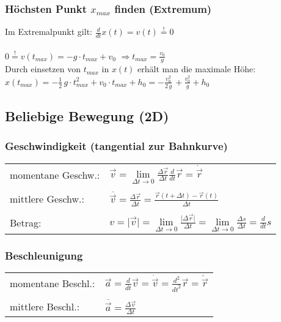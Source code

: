		\subsubsection{Höchsten Punkt $x_{max}$ finden (Extremum)}
		
			Im Extremalpunkt gilt: $\frac{d}{dt} x(t) = v(t) \overset{!}{=} 0$ \\
			\\
			$0 \overset{!}{=} v(t_{max}) = -g \cdot t_{max} + v_0 $ \qquad \qquad $\Rightarrow t_{max} = \frac{v_0}{g}$ \\
			
			Durch einsetzen von $t_{max}$ in $x(t)$ erhält man die maximale Höhe: \\
			$x(t_{max}) = - \frac{1}{2}\, g \cdot t_{max}^2 + v_0 \cdot t_{max} + h_0 = - \frac{v_0^2}{2 \, g}\, + \frac{v_0^2}{g} + h_0 $

	\subsection{Beliebige Bewegung (2D)}
		
		\subsubsection{Geschwindigkeit (tangential zur Bahnkurve)}
		
			\begin{tabular}{ll}
				momentane Geschw.: & $ \vec{v} = \lim \limits_{\Delta t \rightarrow 0} \frac{\Delta \vec{r}}{\Delta t}  \frac{d}{dt} \vec{r} = \dot{\vec{r}}$ \\	
				\\
				mittlere Geschw.: & $\overline{\vec{v}} = \frac{\Delta \vec{r}}{\Delta t} = \frac{\vec{r}(t + \Delta t) - \vec{r}(t)}{\Delta t} $ \\
				\\
				Betrag: & $v = \vert \vec{v} \vert = \lim \limits_{\Delta t \rightarrow 0} \frac{ \vert \Delta \vec{r} \vert}{\Delta t} = \lim \limits_{\Delta t \rightarrow 0} \frac{\Delta s }{\Delta t} = \frac{d}{dt} s$ \\
			\end{tabular}

		\subsubsection{Beschleunigung}
			\begin{tabular}{ll}
				momentane Beschl.: & $ \vec{a} = \frac{d}{dt} \vec{v} = \dot{\vec{v}} = \frac{d^2}{d t^2} \vec{r} = \ddot{\vec{r}}$ \\	
				\\
				mittlere Beschl.: & $\overline{\vec{a}} = \frac{\Delta \vec{v}}{\Delta t} $ \\
			\end{tabular}
		
